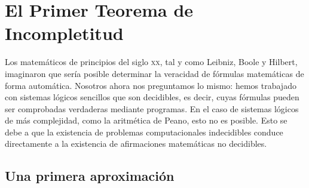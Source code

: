 

\chapter{El Primer Teorema de Incompletitud}\label{ch:teorema-incompletitud}

Los matemáticos de principios del siglo \textsc{xx}, tal y como Leibniz, Boole y Hilbert, imaginaron que sería posible determinar la veracidad de fórmulas matemáticas de forma automática. Nosotros ahora nos preguntamos lo mismo: hemos trabajado con sistemas lógicos sencillos que son decidibles, es decir, cuyas fórmulas pueden ser comprobadas verdaderas mediante programas. En el caso de sistemas lógicos de más complejidad, como la aritmética de Peano, esto no es posible. Esto se debe a que la existencia de problemas computacionales indecidibles conduce directamente a la existencia de afirmaciones matemáticas no decidibles.

\section{Una primera aproximación}\label{sec:primera-aproximacion}

